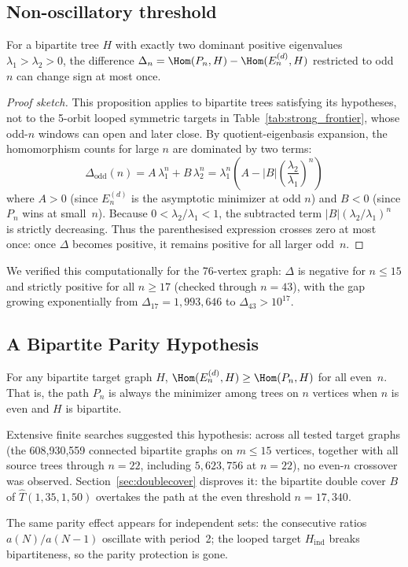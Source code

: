 \subsection*{Non-oscillatory threshold}

\begin{proposition}
For a bipartite tree $H$ with exactly two dominant positive
eigenvalues $\lambda_1 > \lambda_2 > 0$, the difference
$\Delta_n = \Hom(P_n, H) - \Hom(E_n^{(d)}, H)$ restricted to
odd~$n$ can change sign at most once.
\end{proposition}

\begin{proof}[Proof sketch]
This proposition applies to bipartite trees satisfying its hypotheses, not to
the 5-orbit looped symmetric targets in Table~\ref{tab:strong_frontier},
whose odd-$n$ windows can open and later close.
By quotient-eigenbasis expansion, the homomorphism counts for large $n$
are dominated by two terms:
\[
  \Delta_{\mathrm{odd}}(n) = A\,\lambda_1^n + B\,\lambda_2^n
  = \lambda_1^n \!\left( A - |B|\left(\frac{\lambda_2}{\lambda_1}\right)^{\!n}\right)
\]
where $A > 0$ (since $E_n^{(d)}$ is the asymptotic minimizer at odd $n$)
and $B < 0$ (since $P_n$ wins at small~$n$).  Because
$0 < \lambda_2/\lambda_1 < 1$, the subtracted term
$|B|(\lambda_2/\lambda_1)^n$ is strictly decreasing.  Thus the
parenthesised expression crosses zero at most once: once $\Delta$
becomes positive, it remains positive for all larger odd~$n$.
\end{proof}

\noindent
We verified this computationally for the 76-vertex graph: $\Delta$
is negative for $n \le 15$ and strictly positive for all
$n \ge 17$ (checked through $n = 43$), with the gap growing
exponentially from $\Delta_{17} = 1{,}993{,}646$ to
$\Delta_{43} > 10^{17}$.

\subsection*{A Bipartite Parity Hypothesis}

\begin{remark}
For any bipartite target graph $H$, $\Hom(E_n^{(d)}, H) \ge
\Hom(P_n, H)$ for all even~$n$.  That is, the path $P_n$ is
always the minimizer among trees on $n$ vertices when $n$ is even
and $H$ is bipartite.
\end{remark}

\noindent
Extensive finite searches suggested this hypothesis: across all tested
target graphs (the 608,930,559 connected bipartite graphs on $m \le 15$
vertices, together with all source trees through $n=22$, including
$5{,}623{,}756$ at $n=22$), no even-$n$ crossover was observed.
Section~\ref{sec:doublecover}
disproves it: the bipartite double cover $B$ of $\hat T(1,35,1,50)$
overtakes the path at the even threshold $n = 17{,}340$.

\begin{remark}
The same parity effect appears for independent sets: the consecutive
ratios $a(N)/a(N-1)$ oscillate with period~2; the looped target
$H_{\mathrm{ind}}$ breaks bipartiteness, so the parity protection is
gone.
\end{remark}
